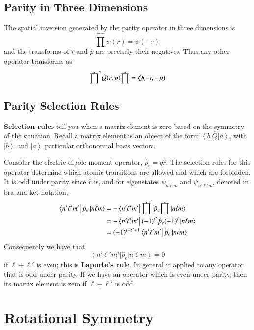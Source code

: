 \documentclass[12pt, a4paper, oneside, openright, titlepage]{book}
\newcommand{\bra}[1]{\left\langle#1\right\vert}
\newcommand{\ket}[1]{\left\vert#1\right\rangle}
\begin{document}
\subsection{Parity in Three Dimensions}

The spatial inversion generated by the parity operator in three dimensions is \begin{equation*}
    \hat{\prod}\psi(r) = \psi(-r)
\end{equation*}
and the transforms of $\hat{r}$ and $\hat{p}$ are precisely their negatives. Thus any other operator transforms as \begin{equation*}
    \hat{\prod}^{\text{\textdagger}}\hat{Q}(r,p)\hat{\prod} = \hat{Q}(-r,-p)
\end{equation*}

\subsection{Parity Selection Rules}

\textbf{Selection rules} tell you when a matrix element is zero based on the symmetry of the situation. Recall a matrix element is an object of the form $\bra{b}\hat{Q}\ket{a}$, with $\ket{b}$ and $\ket{a}$ particular orthonormal basis vectors.

Consider the electric dipole moment operator, $\hat{p}_e = q\hat{r}$. The selection rules for this operator determine which atomic transitions are allowed and which are forbidden. It is odd under parity since $\hat{r}$ is, and for eigenstates $\psi_{n\ell m}$ and $\psi_{n'\ell'm'}$ denoted in bra and ket notation, \begin{align*}
    \bra{n'\ell'm'}\hat{p}_e\ket{n\ell m} &= -\bra{n'\ell'm'}\hat{\prod}^{\text{\textdagger}}\hat{p}_e\hat{\prod}\ket{n\ell m} \\
    &= -\bra{n'\ell'm'}(-1)^{\ell'}\hat{p}_e(-1)^{\ell}\ket{n\ell m} \\
    &= (-1)^{\ell+\ell'+1}\bra{n'\ell'm'}\hat{p}_e\ket{n\ell m}
\end{align*}
Consequently we have that \begin{equation*}
    \bra{n'\ell'm'}\hat{p}_e\ket{n\ell m} = 0
\end{equation*}
if $\ell+\ell'$ is even; this is \textbf{Laporte's rule}. In general it applied to any operator that is odd under parity. If we have an operator which is even under parity, then its matrix element is zero if $\ell+\ell'$ is odd.


\section{Rotational Symmetry}
\end{document}
